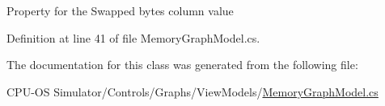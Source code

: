 Property for the Swapped bytes column value 



Definition at line 41 of file Memory\+Graph\+Model.\+cs.



The documentation for this class was generated from the following file\+:\begin{DoxyCompactItemize}
\item 
C\+P\+U-\/\+O\+S Simulator/\+Controls/\+Graphs/\+View\+Models/\hyperlink{_memory_graph_model_8cs}{Memory\+Graph\+Model.\+cs}\end{DoxyCompactItemize}

